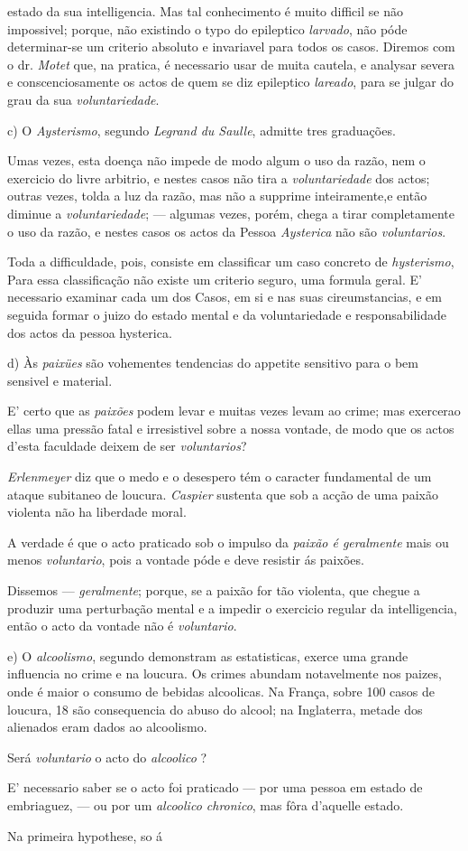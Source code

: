 estado da sua intelligencia. Mas tal conhecimento é muito difficil se não impossivel; porque, não existindo o typo do epileptico \emph{larvado}, não póde determinar-se um criterio absoluto e invariavel para todos os casos. Diremos com o dr. \emph{Motet} que, na pratica, é necessario usar de muita cautela, e analysar severa e conscenciosamente os actos de quem se diz epileptico \emph{lareado}, para se julgar do grau da sua \emph{voluntariedade}.\par c) O \emph{Aysterismo}, segundo \emph{Legrand du Saulle}, admitte tres graduações.\par Umas vezes, esta doença não impede de modo algum o uso da razão, nem o exercicio do livre arbitrio, e nestes casos não tira a \emph{voluntariedade} dos actos; outras vezes, tolda a luz da razão, mas não a supprime inteiramente,e então diminue a \emph{voluntariedade}; --- algumas vezes, porém, chega a tirar completamente o uso da razão, e nestes casos os actos da Pessoa \emph{Aysterica} não são \emph{voluntarios}.\par Toda a difficuldade, pois, consiste em classificar um caso concreto de \emph{hysterismo}, Para essa classificação não existe um criterio seguro, uma formula geral. E' necessario examinar cada um dos Casos, em si e nas suas cireumstancias, e em seguida formar o juizo do estado mental e da voluntariedade e responsabilidade dos actos da pessoa hysterica.\par d) Às \emph{paixües} são vohementes tendencias do appetite sensitivo para o bem sensivel e material.\par E' certo que as \emph{paixões} podem levar e muitas vezes levam ao crime; mas exercerao ellas uma pressão fatal e irresistivel sobre a nossa vontade, de modo que os actos d'esta faculdade deixem de ser \emph{voluntarios}?\par \emph{Erlenmeyer} diz que o medo e o desespero tém o caracter fundamental de um ataque subitaneo de loucura. \emph{Caspier} sustenta que sob a acção de uma paixão violenta não ha liberdade moral.\par A verdade é que o acto praticado sob o impulso da \emph{paixão é geralmente} mais ou menos \emph{voluntario}, pois a vontade póde e deve resistir ás paixões.\par Dissemos --- \emph{geralmente}; porque, se a paixão for tão violenta, que chegue a produzir uma perturbação mental e a impedir o exercicio regular da intelligencia, então o acto da vontade não é \emph{voluntario}.\par e) O \emph{alcoolismo}, segundo demonstram as estatisticas, exerce uma grande influencia no crime e na loucura. Os crimes abundam notavelmente nos paizes, onde é maior o consumo de bebidas alcoolicas. Na França, sobre 100 casos de loucura, 18 são consequencia do abuso do alcool; na Inglaterra, metade dos alienados eram dados ao alcoolismo.\par Será \emph{voluntario} o acto do \emph{alcoolico} ?\par E' necessario saber se o acto foi praticado --- por uma pessoa em estado de embriaguez, --- ou por um \emph{alcoolico chronico}, mas fôra d'aquelle estado.\par Na primeira hypothese, so á 